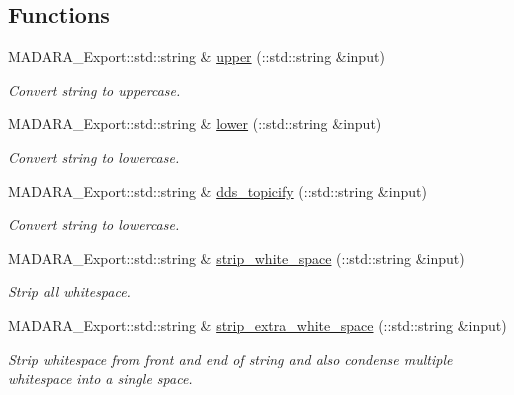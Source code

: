\subsection*{Functions}
\begin{DoxyCompactItemize}
\item 
MADARA\_\-Export::std::string \& \hyperlink{namespaceMadara_1_1Utility_aac788d6f61866a5df6cd3aa420952a12}{upper} (::std::string \&input)
\begin{DoxyCompactList}\small\item\em Convert string to uppercase. \item\end{DoxyCompactList}\item 
MADARA\_\-Export::std::string \& \hyperlink{namespaceMadara_1_1Utility_a5940b4ae59ac2602e351119c6ae0ddb1}{lower} (::std::string \&input)
\begin{DoxyCompactList}\small\item\em Convert string to lowercase. \item\end{DoxyCompactList}\item 
MADARA\_\-Export::std::string \& \hyperlink{namespaceMadara_1_1Utility_afd4c20f5264d3558c4095cd2fa3a5a6c}{dds\_\-topicify} (::std::string \&input)
\begin{DoxyCompactList}\small\item\em Convert string to lowercase. \item\end{DoxyCompactList}\item 
MADARA\_\-Export::std::string \& \hyperlink{namespaceMadara_1_1Utility_a610c1c73acf6e6e8dc2494999e7b3cf1}{strip\_\-white\_\-space} (::std::string \&input)
\begin{DoxyCompactList}\small\item\em Strip all whitespace. \item\end{DoxyCompactList}\item 
MADARA\_\-Export::std::string \& \hyperlink{namespaceMadara_1_1Utility_a88a2317956ea2a3b1958dcb11a3bbbac}{strip\_\-extra\_\-white\_\-space} (::std::string \&input)
\begin{DoxyCompactList}\small\item\em Strip whitespace from front and end of string and also condense multiple whitespace into a single space. \item\end{DoxyCompactList}\item 

\end{DoxyCompactItemize}
